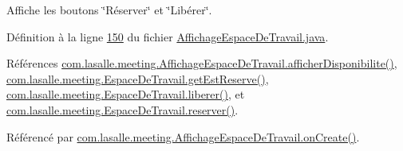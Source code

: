 Affiche les boutons \char`\"{}\+Réserver\char`\"{} et \char`\"{}\+Libérer\char`\"{}. 



Définition à la ligne \hyperlink{_affichage_espace_de_travail_8java_source_l00150}{150} du fichier \hyperlink{_affichage_espace_de_travail_8java_source}{Affichage\+Espace\+De\+Travail.\+java}.



Références \hyperlink{_affichage_espace_de_travail_8java_source_l00127}{com.\+lasalle.\+meeting.\+Affichage\+Espace\+De\+Travail.\+afficher\+Disponibilite()}, \hyperlink{_espace_de_travail_8java_source_l00117}{com.\+lasalle.\+meeting.\+Espace\+De\+Travail.\+get\+Est\+Reserve()}, \hyperlink{_espace_de_travail_8java_source_l00145}{com.\+lasalle.\+meeting.\+Espace\+De\+Travail.\+liberer()}, et \hyperlink{_espace_de_travail_8java_source_l00130}{com.\+lasalle.\+meeting.\+Espace\+De\+Travail.\+reserver()}.



Référencé par \hyperlink{_affichage_espace_de_travail_8java_source_l00041}{com.\+lasalle.\+meeting.\+Affichage\+Espace\+De\+Travail.\+on\+Create()}.


